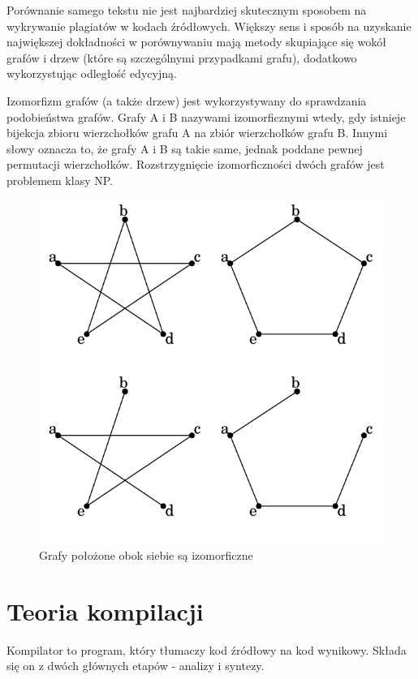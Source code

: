 \documentclass[a4paper,12pt,twoside]{article}
\begin{document}
Porównanie samego tekstu nie jest najbardziej skutecznym sposobem na wykrywanie plagiatów w kodach źródłowych. Większy sens i sposób na uzyskanie największej dokładności w porównywaniu mają metody skupiające się wokół grafów i drzew (które są szczególnymi przypadkami grafu), dodatkowo wykorzystując odległość edycyjną.

Izomorfizm grafów (a także drzew) jest wykorzystywany do sprawdzania podobieństwa grafów. Grafy A i B nazywami izomorficznymi wtedy, gdy istnieje bijekcja zbioru wierzchołków grafu A na zbiór wierzchołków grafu B. Innymi słowy oznacza to, że grafy A i B są takie same, jednak poddane pewnej permutacji wierzchołków. Rozstrzygnięcie izomorficzności dwóch grafów jest problemem klasy NP.

\begin{figure}[h!]
\centering
\includegraphics[scale=0.45]{gfx/isomorphism.png}
\caption{Grafy położone obok siebie są izomorficzne}
\end{figure}

\newpage

\section{Teoria kompilacji}

Kompilator to program, który tłumaczy kod źródłowy na kod wynikowy. Składa się on z dwóch głównych etapów - analizy i syntezy.
\end{document}

